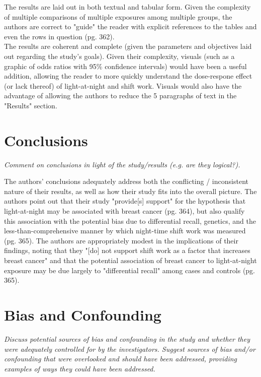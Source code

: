 \documentclass{article}
\begin{document}
\begin{multicols}{2}
The results are laid out in both textual and tabular form.  Given the complexity of multiple comparisons of multiple exposures among multiple groups, the authors are correct to "guide" the reader with explicit references to the tables and even the rows in question (pg. 362).  \\

The results are coherent and complete (given the parameters and objectives laid out regarding the study's goals).  Given their complexity, visuals (such as a graphic of odds ratios with 95\% confidence intervals) would have been a useful addition, allowing the reader to more quickly understand the dose-respone effect (or lack thereof) of light-at-night and shift work.  Visuals would also have the advantage of allowing the authors to reduce the 5 paragraphs of text in the "Results" section.


\section*{Conclusions}
\emph{Comment on conclusions in light of the study/results (e.g. are they logical?).}\\
\vspace{1mm}

The authors' conclusions adequately address both the conflicting / inconsistent nature of their results, as well as how their study fits into the overall picture.  The authors point out that their study "provide[s] support" for the hypothesis that light-at-night may be associated with breast cancer (pg. 364), but also qualify this association with the potential bias due to differential recall, genetics, and the less-than-comprehensive manner by which night-time shift work was measured (pg. 365).  The authors are appropriately modest in the implications of their findings, noting that they "[do] not support shift work as a factor that increases breast cancer" and that the potential association of breast cancer to light-at-night exposure may be due largely to "differential recall" among cases and controls (pg. 365).

\section*{Bias and Confounding}
\emph{Discuss potential sources of bias and confounding in the study and whether they were adequately controlled for by the investigators.  Suggest sources of bias and/or confounding that were overlooked and should have been addressed, providing examples of ways they could have been addressed.}\\
\vspace{1mm}


\end{multicols}
\end{document}
